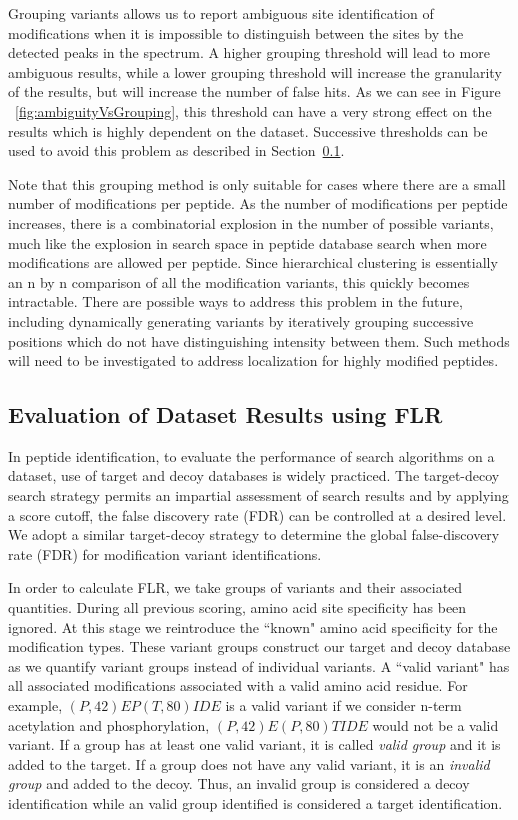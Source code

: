 \documentclass[11pt]{article}
\begin{document}
{Grouping variants allows us to report ambiguous site identification of modifications when it is impossible to distinguish between the sites by the detected peaks in the spectrum. A higher grouping threshold will lead to more ambiguous results, while a lower grouping threshold will increase the granularity of the results, but will increase the number of false hits. As we can see in Figure ~\ref{fig:ambiguityVsGrouping}, this threshold can have a very strong effect on the results which is highly dependent on the dataset. Successive thresholds can be used to avoid this problem as described in Section~\ref{sec:FLR}.

Note that this grouping method is only suitable for cases where there are a small number of modifications per peptide. As the number of modifications per peptide increases, there is a combinatorial explosion in the number of possible variants, much like the explosion in search space in peptide database search when more modifications are allowed per peptide. Since hierarchical clustering is essentially an n by n comparison of all the modification variants, this quickly becomes intractable. There are possible ways to address this problem in the future, including dynamically generating variants by iteratively grouping successive positions which do not have distinguishing intensity between them. Such methods will need to be investigated to address localization for highly modified peptides.

\subsection{Evaluation of Dataset Results using FLR}\label{sec:FLR}
In peptide identification, to evaluate the performance of search algorithms on a dataset, use of target and decoy databases is widely practiced. The target-decoy search strategy permits an impartial assessment of search results and by applying a score cutoff, the false discovery rate (FDR) can be controlled at a desired level. We adopt a similar target-decoy strategy to determine the global false-discovery rate (FDR) for modification variant identifications.

In order to calculate FLR, we take groups of variants and their associated quantities. During all previous scoring, amino acid site specificity has been ignored. At this stage we reintroduce the ``known" amino acid specificity for the modification types. These variant groups construct our target and decoy database as we quantify variant groups instead of individual variants. A ``valid variant" has all associated modifications associated with a valid amino acid residue. For example, $(P,42)EP(T,80)IDE$ is a valid variant if we consider n-term acetylation and phosphorylation, $(P,42)E(P,80)TIDE$ would not be a valid variant. If a group has at least one valid variant, it is called \emph{valid group} and it is added to the target. If a group does not have any valid variant, it is an \emph{invalid group} and added to the decoy. Thus, an invalid group is considered a decoy identification while an valid group identified is considered a target identification.

}
\end{document}
